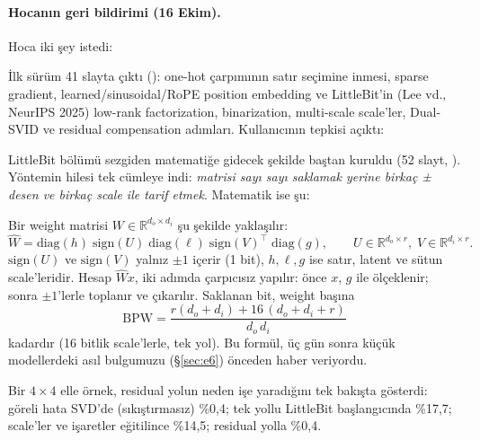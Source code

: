 \paragraph{Hocanın geri bildirimi (16 Ekim).} Hoca iki şey istedi:


İlk sürüm 41 slayta çıktı (): one-hot çarpımının satır seçimine inmesi, sparse gradient, learned/sinusoidal/RoPE position embedding ve LittleBit'in (Lee vd., NeurIPS 2025) low-rank factorization, binarization, multi-scale scale'ler, Dual-SVID ve residual compensation adımları. Kullanıcının tepkisi açıktı:


LittleBit bölümü sezgiden matematiğe gidecek şekilde baştan kuruldu (52 slayt, ). Yöntemin hilesi tek cümleye indi: \emph{matrisi sayı sayı saklamak yerine birkaç ± desen ve birkaç scale ile tarif etmek}. Matematik ise şu:

\begin{ozet}
Bir weight matrisi $W\in\mathbb{R}^{d_o\times d_i}$ şu şekilde yaklaşılır:
\[ \hat W = \mathrm{diag}(h)\;\mathrm{sign}(U)\;\mathrm{diag}(\ell)\;\mathrm{sign}(V)^{\!\top}\;\mathrm{diag}(g), \qquad U\in\mathbb{R}^{d_o\times r},\; V\in\mathbb{R}^{d_i\times r}. \]
$\mathrm{sign}(U)$ ve $\mathrm{sign}(V)$ yalnız $\pm1$ içerir (1 bit), $h, \ell, g$ ise satır, latent ve sütun scale'leridir. Hesap $\hat W x$, iki adımda çarpıcısız yapılır: önce $x$, $g$ ile ölçeklenir; sonra $\pm1$'lerle toplanır ve çıkarılır. Saklanan bit, weight başına
\[ \text{BPW} = \frac{r(d_o+d_i) + 16\,(d_o+d_i+r)}{d_o\,d_i} \]
kadardır (16 bitlik scale'lerle, tek yol). Bu formül, üç gün sonra küçük modellerdeki asıl bulgumuzu (§\ref{sec:e6}) önceden haber veriyordu.
\end{ozet}

Bir $4\times4$ elle örnek, residual yolun neden işe yaradığını tek bakışta gösterdi: göreli hata SVD'de (sıkıştırmasız) \%0,4; tek yollu LittleBit başlangıcında \%17,7; scale'ler ve işaretler eğitilince \%14,5; residual yolla \%0,4.

